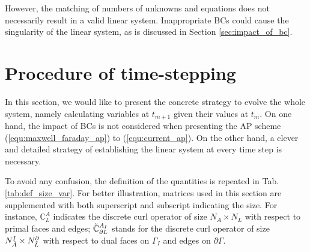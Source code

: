 \documentclass{report}
\begin{document}
However, the matching of numbers of unknowns and equations does not necessarily result in a valid linear system. Inappropriate BCs could cause the singularity of the linear system, as is discussed in Section \ref{sec:impact_of_bc}. 

\section{Procedure of time-stepping}
In this section, we would like to present the concrete strategy to evolve the whole system, namely calculating variables at $t_{m+1}$ given their values at $t_m$. On one hand, the impact of BCs is not considered when presenting the AP scheme (\ref{equ:maxwell_faraday_ap}) to (\ref{equ:current_ap}). On the other hand, a clever and detailed strategy of establishing the linear system at every time step is necessary. 

To avoid any confusion, the definition of the quantities is repeated in Tab. \ref{tab:def_size_var}. For better illustration, matrices used in this section are supplemented with both superscript and subscript indicating the size. For instance, $\mathbb{C}^A_L$ indicates the discrete curl operator of size $N_A \times N_L$ with respect to primal faces and edges; $\Tilde{\mathbb{C}}^{A_I}_{\partial L}$ stands for the discrete curl operator of size $N_{\Tilde{A}}^{I} \times N_{\Tilde{L}}^\partial$ with respect to dual faces on $\Gamma_I$ and edges on $\partial \Gamma$.
\end{document}
